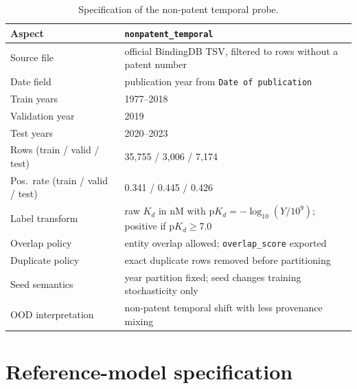\documentclass[referee,pdflatex,sn-basic,Numbered]{sn-jnl}
\begin{document}
\begin{appendices}
\begin{table}[t]
  \centering
  \scriptsize
  \caption{Specification of the non-patent temporal probe.}
  \label{tab:nonpatent-spec}
  \setlength{\tabcolsep}{3.5pt}
  \begin{tabular*}{\textwidth}{@{\extracolsep{\fill}}lp{}@{}}
    \toprule
    Aspect & \texttt{nonpatent\_temporal} \\
    \midrule
    Source file & official BindingDB TSV, filtered to rows without a patent number \\
    Date field & publication year from \texttt{Date of publication} \\
    Train years & 1977--2018 \\
    Validation year & 2019 \\
    Test years & 2020--2023 \\
    Rows (train / valid / test) & 35,755 / 3,006 / 7,174 \\
    Pos.\ rate (train / valid / test) & 0.341 / 0.445 / 0.426 \\
    Label transform & raw $K_d$ in nM with $\mathrm{p}K_d = -\log_{10}(Y / 10^9)$; positive if $\mathrm{p}K_d \ge 7.0$ \\
    Overlap policy & entity overlap allowed; \texttt{overlap\_score} exported \\
    Duplicate policy & exact duplicate rows removed before partitioning \\
    Seed semantics & year partition fixed; seed changes training stochasticity only \\
    OOD interpretation & non-patent temporal shift with less provenance mixing \\
    \bottomrule
  \end{tabular*}
\end{table}

\section{Reference-model specification}


\end{appendices}
\end{document}
